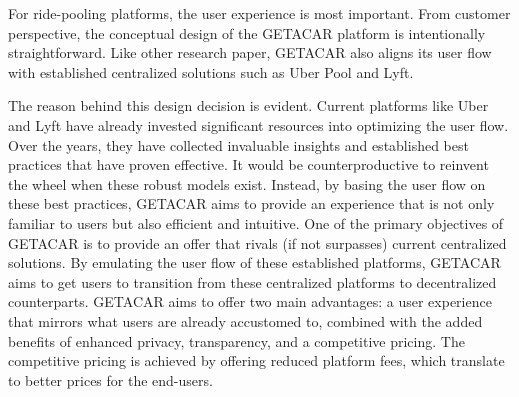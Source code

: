 For ride-pooling platforms, the user experience is most important. From customer perspective, the conceptual design of the GETACAR platform is intentionally straightforward. Like other research paper, GETACAR also aligns its user flow with established centralized solutions such as Uber Pool and Lyft.

The reason behind this design decision is evident. Current platforms like Uber and Lyft have already invested significant resources into optimizing the user flow. Over the years, they have collected invaluable insights and established best practices that have proven effective. It would be counterproductive to reinvent the wheel when these robust models exist. Instead, by basing the user flow on these best practices, GETACAR aims to provide an experience that is not only familiar to users but also efficient and intuitive. 
One of the primary objectives of GETACAR is to provide an offer that rivals (if not surpasses) current centralized solutions. By emulating the user flow of these established platforms, GETACAR aims to get users to transition from these centralized platforms to decentralized counterparts. GETACAR aims to offer two main advantages: a user experience that mirrors what users are already accustomed to, combined with the added benefits of enhanced privacy, transparency, and a competitive pricing. The competitive pricing is achieved by offering reduced platform fees, which translate to better prices for the end-users. 

